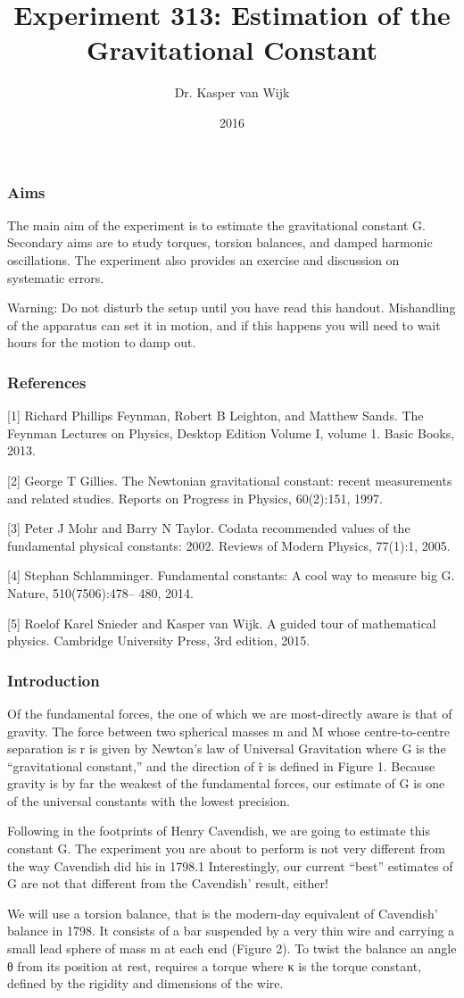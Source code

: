 \documentclass{beamer}
\title{Experiment 313: Estimation of the Gravitational Constant}
\author{Dr. Kasper van Wijk}
\institute{University of Auckland}
\date{2016}
\begin{document}
 
\frame{\titlepage}
 
\begin{frame}
\frametitle{Aims}
The main aim of the experiment is to estimate the gravitational constant G.
Secondary aims are to study torques, torsion balances, and damped harmonic
oscillations. The experiment also provides an exercise and discussion on
systematic errors.

Warning: Do not disturb the setup until you have read this handout. Mishandling
of the apparatus can set it in motion, and if this happens you will need to
wait hours for the motion to damp out.
\end{frame}
 
\begin{frame}
\frametitle{References}
[1] Richard Phillips Feynman, Robert B Leighton, and Matthew Sands. The Feynman
Lectures on Physics, Desktop Edition Volume I, volume 1. Basic Books, 2013.

[2] George T Gillies. The Newtonian gravitational constant: recent measurements
and related studies.  Reports on Progress in Physics, 60(2):151, 1997.

[3] Peter J Mohr and Barry N Taylor. Codata recommended values of the
fundamental physical constants: 2002. Reviews of Modern Physics, 77(1):1, 2005.

[4] Stephan Schlamminger. Fundamental constants: A cool way to measure big G.
Nature, 510(7506):478– 480, 2014.

[5] Roelof Karel Snieder and Kasper van Wijk. A guided tour of mathematical
physics. Cambridge University Press, 3rd edition, 2015.
\end{frame}

\begin{frame}
\frametitle{Introduction}
Of the fundamental forces, the one of which we are most-directly aware is that
of gravity. The force between two spherical masses m and M whose
centre-to-centre separation is r is given by Newton’s law of Universal
Gravitation where G is the “gravitational constant,” and the direction of r̂ is
defined in Figure 1. Because gravity is by far the weakest of the fundamental
forces, our estimate of G is one of the universal constants with the lowest
precision.

Following in the footprints of Henry Cavendish, we are going to estimate this
constant G. The experiment you are about to perform is not very different from
the way Cavendish did his in 1798.1 Interestingly, our current “best” estimates
of G are not that different from the Cavendish’ result, either!

We will use a torsion balance, that is the modern-day equivalent of Cavendish’
balance in 1798. It consists of a bar suspended by a very thin wire and
carrying a small lead sphere of mass m at each end (Figure 2).  To twist the
balance an angle θ from its position at rest, requires a torque where κ is the
torque constant, defined by the rigidity and dimensions of the wire.
\end{frame}
\end{document}
